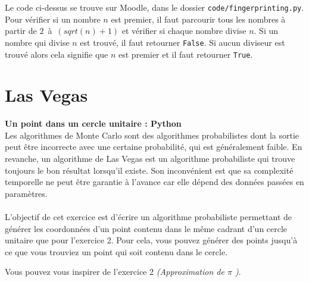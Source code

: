 \begin{Exercice}[15 minutes]
\begin{conseil}
Le code ci-dessus se trouve sur Moodle, dans le dossier \lstinline{code/fingerprinting.py}.\\
Pour vérifier si un nombre $n$ est premier, il faut  parcourir tous les nombres à partir de $2$~à~$(sqrt(n)+1)$ et vérifier si chaque nombre divise $n$. Si un nombre qui divise $n$ est trouvé, il faut retourner \lstinline{False}. Si aucun diviseur est trouvé alors cela signifie que $n$ est premier et il faut retourner \lstinline{True}.
\end{conseil}

    \begin{solution}
        
    \end{solution}
\end{Exercice}


\section{Las Vegas}

\begin{Exercice}[10 minutes]\textbf{Un point dans un cercle unitaire : Python} \optionnel\\
    Les algorithmes de Monte Carlo sont des algorithmes probabilistes dont la sortie peut être incorrecte avec une certaine probabilité, qui est généralement faible. En revanche, un algorithme de Las Vegas est un algorithme probabiliste qui trouve toujours le bon résultat lorsqu'il existe. Son inconvénient est que sa complexité temporelle ne peut être garantie à l'avance car elle dépend des données passées en paramètres.\\ \\
    L'objectif de cet exercice est d'écrire un algorithme probabiliste permettant de générer les coordonnées d'un point contenu dans le même cadrant d'un cercle unitaire que pour l'exercice 2. Pour cela, vous pouvez générer des points jusqu'à ce que vous trouviez un point qui soit contenu dans le cercle.
    
    \begin{conseil}
       Vous pouvez vous inspirer de l'exercice 2 \textit{(Approximation de $\pi$ )}.
    \end{conseil}
    \begin{solution}
     
    \end{solution}
    \end{Exercice}
    
